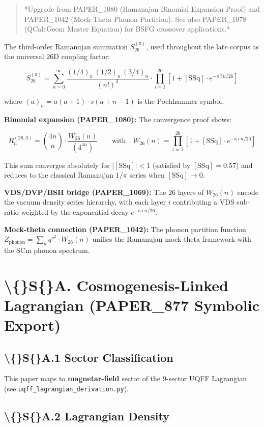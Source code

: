 \documentclass[11pt]{article}
\begin{document}
\begin{quote}
*Upgrade from PAPER\_1080 (Ramanujan Binomial Expansion Proof) and
PAPER\_1042 (Mock-Theta Phonon Partition).  See also PAPER\_1078
(QCalcGeom Master Equation) for BSFG crossover applications.*
\end{quote}

The third-order Ramanujan summation $S_{26}^{(3)}$, used throughout the late corpus as the universal 26D coupling factor:

$$S_{26}^{(3)} = \sum_{n=0}^{\infty} \frac{(1/4)_n\,(1/2)_n\,(3/4)_n}{(n!)^3} \cdot \prod_{i=1}^{26}\left[1 + [\text{SSq}]\cdot e^{-\kappa\,i\,n/26}\right]$$

where $(a)_n = a(a+1)\cdot s(a+n-1)$ is the Pochhammer symbol.

\textbf{Binomial expansion (PAPER\_1080):} The convergence proof shows:

$$R_n^{(26,3)} = \binom{4n}{n} \cdot \frac{W_{26}(n)}{(4^{4n})} \qquad \text{with}\quad W_{26}(n) = \prod_{i=1}^{26}\left[1 + [\text{SSq}]\cdot e^{-\kappa\,i\,n/26}\right]$$

This sum converges absolutely for $|[\text{SSq}]| < 1$ (satisfied by $[\text{SSq}] = 0.57$) and reduces to the classical Ramanujan $1/\pi$ series when $[\text{SSq}] \to 0$.

\textbf{VDS/DVP/BSH bridge (PAPER\_1069):} The 26 layers of $W_{26}(n)$ encode the vacuum density series hierarchy, with each layer $i$ contributing a VDS sub-ratio weighted by the exponential decay $e^{-\kappa\,i\,n/26}$.

\textbf{Mock-theta connection (PAPER\_1042):} The phonon partition function $Z_{\text{phonon}} = \sum_n q^{n^2} \cdot W_{26}(n)$ unifies the Ramanujan mock-theta framework with the SCm phonon spectrum.

\section*{\textbackslash\{\}S\{\}A. Cosmogenesis-Linked Lagrangian (PAPER\_877 Symbolic Export)}

\subsection*{\textbackslash\{\}S\{\}A.1 Sector Classification}

This paper maps to \textbf{magnetar-field} sector of the 9-sector UQFF Lagrangian (see \verb|uqff_lagrangian_derivation.py|).

\subsection*{\textbackslash\{\}S\{\}A.2 Lagrangian Density}
\end{document}

